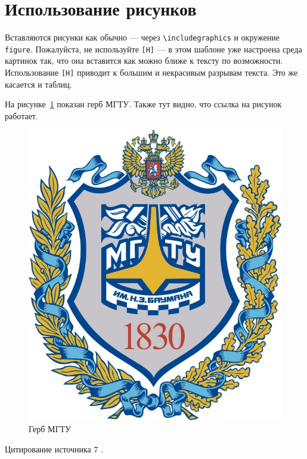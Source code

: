\section{Использование рисунков}

Вставляются рисунки как обычно --- через 
\texttt{\textbackslash includegraphics} и окружение 
\texttt{figure}. 
Пожалуйста, не используйте \texttt{[H]} --- 
в этом шаблоне уже настроена среда картинок так, 
что она вставится как можно ближе к тексту по возможности. 
Использование \texttt{[H]} приводит к большим и некрасивым 
разрывам текста. Это же касается и таблиц.

На рисунке~\ref{fig:fig01} показан герб МГТУ. 
Также тут видно, что ссылка на рисунок работает.
\begin{figure}
  \centering
  \includegraphics[scale=0.7]{inc/bmstu}
  \caption{Герб МГТУ}
  \label{fig:fig01}
\end{figure}


\lipsum[1-4]

Цитирование источника 7 \cite{Wikipedia7}.
